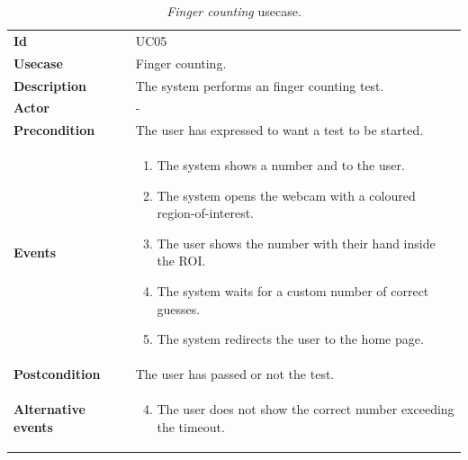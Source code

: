 \begin{table}[h!t]
    \centering
    \caption{\emph{Finger counting} usecase.}
    \label{tab:uc:finger}
    \centering
    \begin{tabular}{l | p{80mm}}
        \textbf{Id}                 & UC05                                                 \\
        \textbf{Usecase}            & Finger counting.                                     \\
        \textbf{Description}        & The system performs an finger counting test.         \\
        \textbf{Actor}              & -                                                    \\
        \textbf{Precondition}       & The user has expressed to want a test to be started. \\
        \textbf{Events}             & \begin{enumerate}
            \item The system shows a number and to the user.
            \item The system opens the webcam with a coloured region-of-interest.
            \item The user shows the number with their hand inside the ROI.
            \item The system waits for a custom number of correct guesses.
            \item The system redirects the user to the home page.
        \end{enumerate}                            \\
        \textbf{Postcondition}      & The user has passed or not the test.                 \\
        \textbf{Alternative events} & \begin{enumerate}
            \setcounter{enumi}{3}
            \item The user does not show the correct number exceeding the timeout.
        \end{enumerate}
    \end{tabular}
\end{table}

